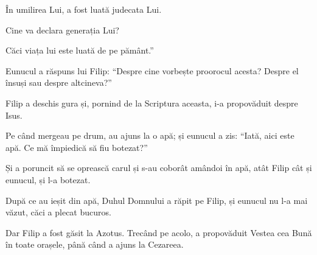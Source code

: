 {\par }{\Q {}În umilirea Lui, a fost luată judecata Lui.

\par }{\QB Cine va declara generația Lui?

\par }{\QB Căci viața lui este luată de pe pământ.”


\par }{\PP {}Eunucul a răspuns lui Filip: “Despre cine vorbește proorocul acesta? Despre el însuși sau despre altcineva?”


\par }{\PP {}Filip a deschis gura și, pornind de la Scriptura aceasta, i-a propovăduit despre Isus.

Pe când mergeau pe drum, au ajuns la o apă; și eunucul a zis: “Iată, aici este apă. Ce mă împiedică să fiu botezat?”


\par }{\PP {}

Și a poruncit să se oprească carul și s-au coborât amândoi în apă, atât Filip cât și eunucul, și l-a botezat.


\par }{\PP {}După ce au ieșit din apă, Duhul Domnului a răpit pe Filip, și eunucul nu l-a mai văzut, căci a plecat bucuros.

Dar Filip a fost găsit la Azotus. Trecând pe acolo, a propovăduit Vestea cea Bună în toate orașele, până când a ajuns la Cezareea.



\par }
